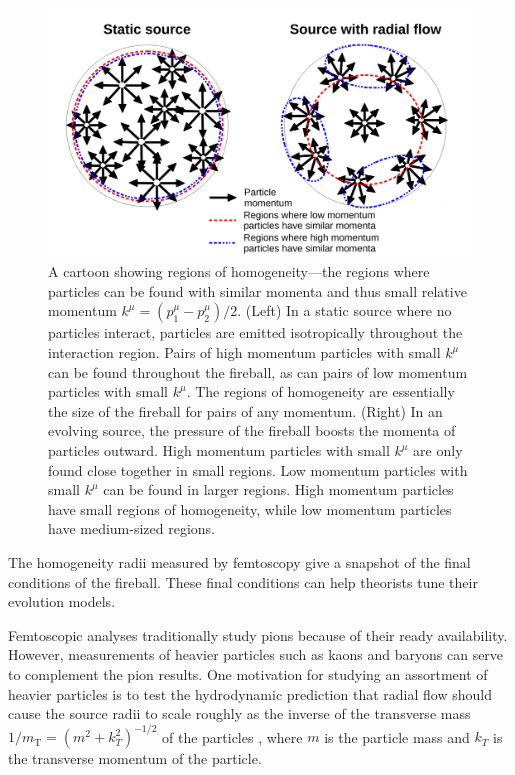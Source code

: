 \begin{figure}[hbt]
\includegraphics[width=36pc]{Figures/HomemadeFigures/RegionsOfHomogeneity.pdf}
\caption[Regions of homogeneity]{A cartoon showing regions of homogeneity---the regions where particles can be found with similar momenta and thus small relative momentum $k^\mu = (p_1^\mu - p_2^\mu)/2$.
(Left) In a static source where no particles interact, particles are emitted isotropically throughout the interaction region.
Pairs of high momentum particles with small $k^\mu$ can be found throughout the fireball, as can pairs of low momentum particles with small $k^\mu$.
The regions of homogeneity are essentially the size of the fireball for pairs of any momentum.
(Right) In an evolving source, the pressure of the fireball boosts the momenta of particles outward.
High momentum particles with small $k^\mu$ are only found close together in small regions.
Low momentum particles with small $k^\mu$ can be found in larger regions.
High momentum particles have small regions of homogeneity, while low momentum particles have medium-sized regions.}
\label{fig:RegionsOfHomogeneity}
\end{figure}


The homogeneity radii measured by femtoscopy give a snapshot of the final conditions of the fireball.
These final conditions can help theorists tune their evolution models.




Femtoscopic analyses traditionally study pions \cite{Goldhaber:1960sf,Aamodt:2011mr} because of their ready availability.  
However, measurements of heavier particles such as kaons \cite{Abelev:2012ms} and baryons \cite{Gos:2007cj} can serve to complement the pion results.  
One motivation for studying an assortment of heavier particles is to test the hydrodynamic prediction that radial flow should cause the source radii to scale roughly as the inverse of the transverse mass $1/m_{\mathrm{T}} = (m^2 + k^2_T)^{-1/2}$ of the particles \cite{Csorgo:1995bi,Lisa:2005dd}, where $m$ is the particle mass and $k_T$ is the transverse momentum of the particle.

